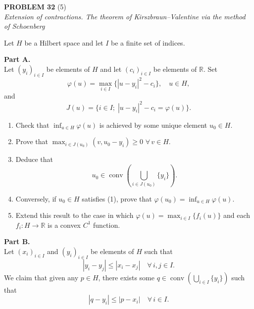\documentclass[12pt]{article}
\newcommand{\abs}[1]{\left|#1\right|}
\newcommand{\R}{\mathbb{R}}
\begin{document}
\bigskip
 
\noindent\textbf{PROBLEM 32} (5)\\[4pt]
\textit{Extension of contractions. The theorem of Kirszbraun--Valentine
via the method of Schoenberg}
 
\medskip
 
Let $H$ be a Hilbert space and let $I$ be a finite set of indices.
 
\medskip
 
\noindent\textbf{Part A.}\\
Let $(y_i)_{i \in I}$ be elements of $H$ and let $(c_i)_{i \in I}$ be elements of $\R$. Set
\[
\varphi(u) = \max_{i \in I}\{\abs{u - y_i}^2 - c_i\}, \quad u \in H,
\]
and
\[
J(u) = \{i \in I;\; \abs{u - y_i}^2 - c_i = \varphi(u)\}.
\]
 
\begin{enumerate}
\item Check that $\inf_{u \in H} \varphi(u)$ is achieved by some unique element $u_0 \in H$.
 
\item Prove that $\max_{i \in J(u_0)}(v, u_0 - y_i) \ge 0$ $\forall\, v \in H$.
 
\item Deduce that
\begin{equation}\tag{1}
u_0 \in \operatorname{conv}\!\left(\bigcup_{i \in J(u_0)}\{y_i\}\right).
\end{equation}
 
\item Conversely, if $u_0 \in H$ satisfies (1), prove that $\varphi(u_0) = \inf_{u \in H}\varphi(u)$.
 
\item Extend this result to the case in which $\varphi(u) = \max_{i \in I}\{f_i(u)\}$ and each
$f_i : H \to \R$ is a convex $C^1$ function.
\end{enumerate}
 
\noindent\textbf{Part B.}\\
Let $(x_i)_{i \in I}$ and $(y_i)_{i \in I}$ be elements of $H$ such that
\[
\abs{y_i - y_j} \le \abs{x_i - x_j} \quad \forall\, i, j \in I.
\]
We claim that given any $p \in H$, there exists some $q \in \operatorname{conv}\!\left(\bigcup_{i \in I}\{y_i\}\right)$
such that
\[
\abs{q - y_i} \le \abs{p - x_i} \quad \forall\, i \in I.
\]
 
\end{document}
